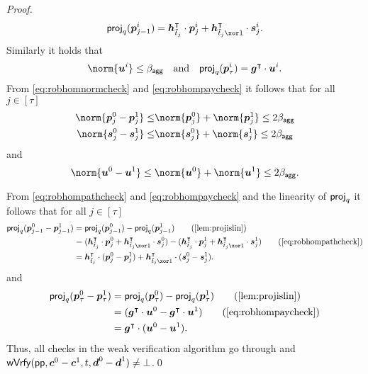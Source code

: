 \begin{proof}
\begin{align}
  \proj_q(\vec{p}^i_{j-1}) = \vec{h}_{\tilde t_j}^\intercal\cdot \vec{p}^i_{j} + \vec{h}_{\tilde t_j\xor 1}^\intercal \cdot \vec{s}^i_{j}.\label{eq:robhompathcheck}
  \end{align}
  Similarly it holds that
  \begin{align}
  \norm{\vec{u}^i} \leq \bagg\quad \text{and}\quad \proj_q(\vec{p}^i_{\tau}) = \vec{g}^\intercal\cdot \vec{u}^i.\label{eq:robhompaycheck}
  \end{align}
  From \autoref{eq:robhomnormcheck} and \autoref{eq:robhompaycheck} it follows that for all $j \in [\tau]$
  \begin{align*}
    \norm{\vec{p}_j^0-\vec{p}_j^1} \leq& \norm{\vec{p}_j^0} + \norm{\vec{p}_j^1} \leq 2\bagg\\
    \norm{\vec{s}_j^0-\vec{s}_j^1} \leq& \norm{\vec{s}_j^0} + \norm{\vec{s}_j^1} \leq 2\bagg
  \end{align*}
  and
  \[
      \norm{\vec{u}^0-\vec{u}^1} \leq \norm{\vec{u}^0} + \norm{\vec{u}^1} \leq 2\bagg.
  \]
  
  From \autoref{eq:robhompathcheck} and \autoref{eq:robhompaycheck} and the linearity of $\mathsf{proj}_q$ it follows that for all $j \in [\tau]$
  \begin{align*}
    \proj_q(\vec{p}^0_{j-1}-\vec{p}^1_{j-1})
    ={}&\proj_q(\vec{p}^0_{j-1})-\proj_q(\vec{p}^1_{j-1})\tag{\autoref{lem:projislin}}\\
    ={}&(\vec{h}_{\tilde t_j}^\intercal\cdot \vec{p}^0_{j} + \vec{h}_{\tilde t_j\xor 1}^\intercal \cdot \vec{s}^0_{j})- (\vec{h}_{\tilde t_j}^\intercal\cdot \vec{p}^1_{j} + \vec{h}_{\tilde t_j\xor 1}^\intercal \cdot \vec{s}^1_{j})\tag{\autoref{eq:robhompathcheck}}\\
  ={}&\vec{h}_{\tilde t_j}^\intercal\cdot (\vec{p}^0_{j} - \vec{p}^1_{j}) + \vec{h}_{\tilde t_j\xor 1}^\intercal \cdot (\vec{s}^0_{j} - \vec{s}^1_{j}).
  \end{align*}
  and
  \begin{align*}
    \proj_q(\vec{p}^0_{\tau}-\vec{p}^1_{\tau})
    ={}&\proj_q(\vec{p}^0_{\tau})-\proj_q(\vec{p}^1_{\tau})\tag{\autoref{lem:projislin}}\\
    ={}&(\vec{g}^\intercal\cdot \vec{u}^0 - \vec{g}^\intercal \cdot \vec{u}^1)\tag{\autoref{eq:robhompaycheck}}\\
  ={}&\vec{g}^\intercal\cdot (\vec{u}^0 - \vec{u}^1).
  \end{align*}
  Thus, all checks in the weak verification algorithm go through and $\mathsf{wVrfy}(\mathsf{pp},\boldsymbol{c}^0-\boldsymbol{c}^1, t,\boldsymbol{d}^0-\boldsymbol{d}^1)\neq\bot$.\qed
\end{proof}

